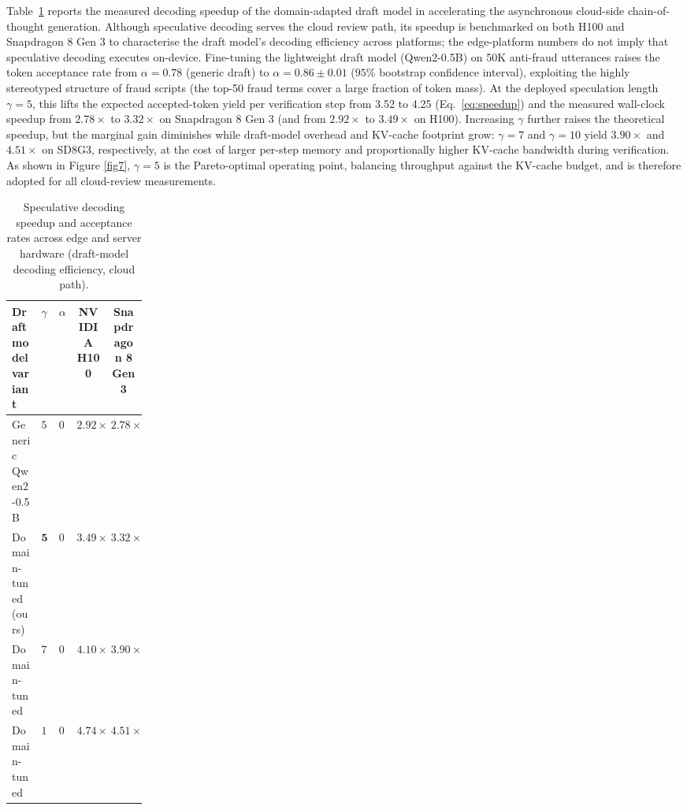 \documentclass[a4paper,fleqn]{cas-sc}
\begin{document}
Table~\ref{tab:speculative_decoding-en} reports the measured decoding speedup of the domain-adapted draft model in accelerating the asynchronous cloud-side chain-of-thought generation. Although speculative decoding serves the cloud review path, its speedup is benchmarked on both H100 and Snapdragon 8 Gen 3 to characterise the draft model's decoding efficiency across platforms; the edge-platform numbers do not imply that speculative decoding executes on-device. Fine-tuning the lightweight draft model (Qwen2-0.5B) on 50K anti-fraud utterances raises the token acceptance rate from $\alpha=0.78$ (generic draft) to $\alpha=0.86 \pm 0.01$ ($95\%$ bootstrap confidence interval), exploiting the highly stereotyped structure of fraud scripts (the top-50 fraud terms
cover a large fraction of token mass). At the deployed speculation length $\gamma=5$, this lifts the expected accepted-token
yield per verification step from 3.52 to 4.25 (Eq.~\eqref{eq:speedup}) and the measured wall-clock speedup from $2.78\times$ to $3.32\times$ on Snapdragon 8 Gen 3 (and from $2.92\times$ to $3.49\times$ on H100). Increasing
$\gamma$ further raises the theoretical speedup, but the marginal gain diminishes while draft-model overhead and KV-cache footprint grow: $\gamma=7$ and $\gamma=10$ yield $3.90\times$ and $4.51\times$ on SD8G3, respectively, at the cost of larger per-step memory and proportionally higher KV-cache bandwidth during verification. As shown in Figure \ref{fig7}, $\gamma=5$ is the Pareto-optimal operating point, balancing throughput against the KV-cache budget, and is therefore adopted for all cloud-review measurements.

\begin{table}[h]
\centering
\caption{Speculative decoding speedup and acceptance rates across edge and server hardware (draft-model decoding efficiency, cloud path).}
\label{tab:speculative_decoding-en}
\small
\renewcommand{\arraystretch}{1.1}
\begin{tabular}{l>{\centering\arraybackslash}p{0.1\linewidth}>{\centering\arraybackslash}p{0.1\linewidth}cc}
\toprule
\textbf{Draft model variant} & $\gamma$ & $\alpha$ & \textbf{NVIDIA H100} & \textbf{Snapdragon 8 Gen 3} \\
\midrule
Generic Qwen2-0.5B & $5$ & $0.78$ & $2.92\times$ & $2.78\times$ \\
Domain-tuned (ours) & $\mathbf{5}$ & $\mathbf{0.86}$ & $\mathbf{3.49\times}$ & $\mathbf{3.32\times}$ \\
Domain-tuned & $7$ & $0.86$ & $4.10\times$ & $3.90\times$ \\
Domain-tuned & $10$ & $0.86$ & $4.74\times$ & $4.51\times$ \\
\bottomrule
\end{tabular}
\end{table}
\end{document}
